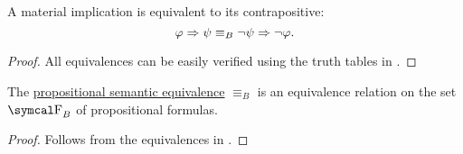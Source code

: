 \begin{proposition}
\begin{PropEnum}
     A material implication is equivalent to its contrapositive:
    \begin{equation}\label{eq:def:boolean_equivalences/contrapositive}
      \varphi \Rightarrow \psi \equiv_B \neg \psi \Rightarrow \neg \varphi.
    \end{equation}
  \end{PropEnum}
\end{proposition}
\begin{proof}
  All equivalences can be easily verified using the truth tables in .
\end{proof}

\begin{proposition}\label{thm:boolean_equivalence_relation}
  The \hyperref[def:propositional_interpretation/equivalence]{propositional semantic equivalence} \( \equiv_B \) is an equivalence relation on the set \( \CF_B \) of propositional formulas.
\end{proposition}
\begin{proof}
  Follows from the equivalences in .
\end{proof}

